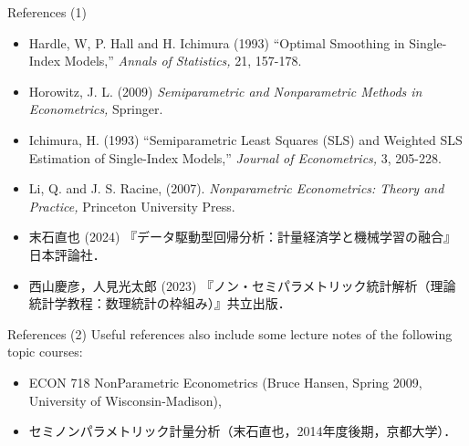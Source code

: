 \documentclass[xcolor=svgnames,dvipdfmx,cjk]{beamer}
\theoremstyle{example}
\begin{document}
\begin{frame}{References (1)}
  \begin{itemize}
    \item Hardle, W, P. Hall and H. Ichimura (1993)
          ``Optimal Smoothing in Single-Index Models,'' \textit{Annals of Statistics,} 21, 157-178.
    \item Horowitz, J. L. (2009)
          \textit{Semiparametric and Nonparametric Methods in Econometrics,}
          Springer.
    \item Ichimura, H. (1993) 
          ``Semiparametric Least Squares (SLS) and Weighted SLS Estimation of Single-Index Models,''
          \textit{Journal of Econometrics,} 3, 205-228. 
    \item Li, Q. and J. S. Racine, (2007). 
          \textit{Nonparametric Econometrics: Theory and Practice,} 
          Princeton University Press.
    \item 末石直也 (2024) 『データ駆動型回帰分析：計量経済学と機械学習の融合』日本評論社．
    \item 西山慶彦，人見光太郎 (2023) 『ノン・セミパラメトリック統計解析（理論統計学教程：数理統計の枠組み）』共立出版．
  \end{itemize}
\end{frame}

\begin{frame}{References (2)}
\quad 
Useful references also include some lecture notes of the following topic courses:
  \begin{itemize}
    \item ECON 718 NonParametric Econometrics (Bruce Hansen, Spring 2009, University of Wisconsin-Madison),
    \item セミノンパラメトリック計量分析（末石直也，2014年度後期，京都大学）．
  \end{itemize}
\end{frame}
\end{document}
